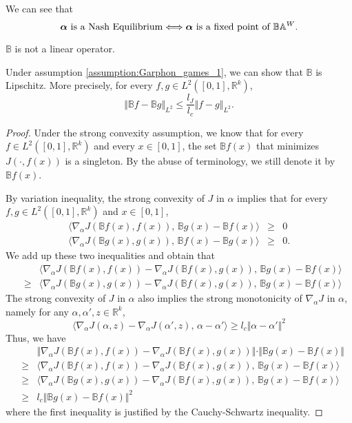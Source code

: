 We can see that
$$
	\boldsymbol{\alpha} \text{ is a Nash Equilibrium} \Longleftrightarrow \boldsymbol{\alpha} \text{ is a fixed point of } \mathbb{B} \mathbb{A}^W.
$$

\begin{remark}
	$\mathbb{B}$ is not a linear operator.
\end{remark}

\begin{lemma}
Under assumption \ref{assumption:Garphon_games_1}, we can show that $\mathbb{B}$ is Lipschitz. More precisely, for every $f,g \in L^2([0,1], \mathbb{R}^k)$,
$$
	\Vert \mathbb{B} f - \mathbb{B} g \Vert_{L^2} \leq \frac{l_J}{l_c} \Vert f - g \Vert_{L^2}.
$$
\label{lemma:continuity_of_B}
\end{lemma}

\begin{proof}
	Under the strong convexity assumption, we know that for every $f \in L^2([0,1], \mathbb{R}^k)$ and every $x \in [0,1]$, the set $\mathbb{B}f(x)$ that minimizes $J(\cdot, f(x))$ is a singleton. By the abuse of terminology, we still denote it by $\mathbb{B}f(x)$.
	
	By variation inequality, the strong convexity of $J$ in $\alpha$ implies that for every $f,g \in L^2([0,1], \mathbb{R}^k)$ and $x \in [0,1]$, 
	\begin{eqnarray*}
		\langle \nabla_\alpha J(\mathbb{B}f(x), f(x)) , \, \mathbb{B}g(x)- \mathbb{B}f(x)  \rangle&\geq & 0 \\
		\langle \nabla_\alpha J(\mathbb{B}g(x), g(x)) , \, \mathbb{B}f(x)- \mathbb{B}g(x) \rangle &\geq & 0.
	\end{eqnarray*}
	We add up these two inequalities and obtain that
	\begin{eqnarray*}
		&&\langle \nabla_\alpha J(\mathbb{B}f(x), f(x)) - \nabla_\alpha J(\mathbb{B}f(x), g(x) ) , \,   \mathbb{B}g(x)- \mathbb{B}f(x) \rangle  \\
		&\geq& 	\langle \nabla_\alpha J(\mathbb{B}g(x),  g(x)) - \nabla_\alpha J(\mathbb{B}f(x), g(x) ) ,\,  \mathbb{B}g(x)- \mathbb{B}f(x) \rangle
	\end{eqnarray*}
	The strong convexity of $J$ in $\alpha$ also implies the strong monotonicity of $\nabla_\alpha J$ in $\alpha$, namely for any $\alpha, \alpha', z \in \mathbb{R}^k$,
	$$
		\langle \nabla_\alpha J(\alpha, z) - \nabla_\alpha J(\alpha',z),\, \alpha - \alpha' \rangle \geq l_c \Vert \alpha - \alpha' \Vert^2
	$$
	Thus, we have
	\begin{eqnarray*}
		&& \Vert \nabla_\alpha J(\mathbb{B}f(x), f(x)) - \nabla_\alpha J(\mathbb{B}f(x), g(x) )  \Vert \cdot \Vert  \mathbb{B}g(x)- \mathbb{B}f(x) \Vert  \\
		&\ge & 	\langle \nabla_\alpha J(\mathbb{B}f(x), f(x)) - \nabla_\alpha J(\mathbb{B}f(x), g(x) ) , \,   \mathbb{B}g(x)- \mathbb{B}f(x) \rangle \\
		& \geq & \langle \nabla_\alpha J(\mathbb{B}g(x),  g(x)) - \nabla_\alpha J(\mathbb{B}f(x), g(x) ) ,\,  \mathbb{B}g(x)- \mathbb{B}f(x) \rangle \\
		&\geq & l_c \Vert \mathbb{B}g(x) - \mathbb{B}f(x) \Vert^2
	\end{eqnarray*}
	where the first inequality is justified by the Cauchy-Schwartz inequality.
	

\end{proof}
